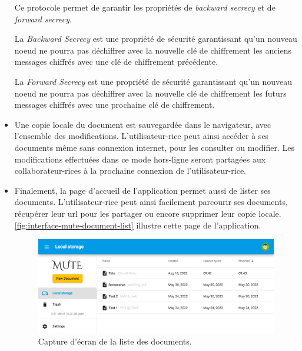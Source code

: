 \begin{itemize}
        Ce protocole permet de garantir les propriétés de \emph{backward secrecy} et de \emph{forward secrecy}.
        \begin{definition}
            La \emph{Backward Secrecy} est une propriété de sécurité garantissant qu'un nouveau noeud ne pourra pas déchiffrer avec la nouvelle clé de chiffrement les anciens messages chiffrés avec une clé de chiffrement précédente.
        \end{definition}
        \begin{definition}
            La \emph{Forward Secrecy} est une propriété de sécurité garantissant qu'un nouveau noeud ne pourra pas déchiffrer avec la nouvelle clé de chiffrement les futurs messages chiffrés avec une prochaine clé de chiffrement.
        \end{definition}
    \item Une copie locale du document est sauvegardée dans le navigateur, avec l'ensemble des modifications.
        L'utilisateur-rice peut ainsi accéder à ses documents même sans connexion internet, pour les consulter ou modifier.
        Les modifications effectuées dans ce mode hors-ligne seront partagées aux collaborateur-rices à la prochaine connexion de l'utilisateur-rice.
    \item Finalement, la page d'accueil de l'application permet aussi de lister ses documents.
        L'utilisateur-rice peut ainsi facilement parcourir ses documents, récupérer leur url pour les partager ou encore supprimer leur copie locale.
        \autoref{fig:interface-mute-document-list} illustre cette page de l'application.
        \begin{figure}[!ht]
            \centering
            \includegraphics[width=\linewidth]{img/screenshot-mute-document-list.png}
            \caption{Capture d'écran de la liste des documents.}
            \label{fig:interface-mute-document-list}
        \end{figure}
\end{itemize}
